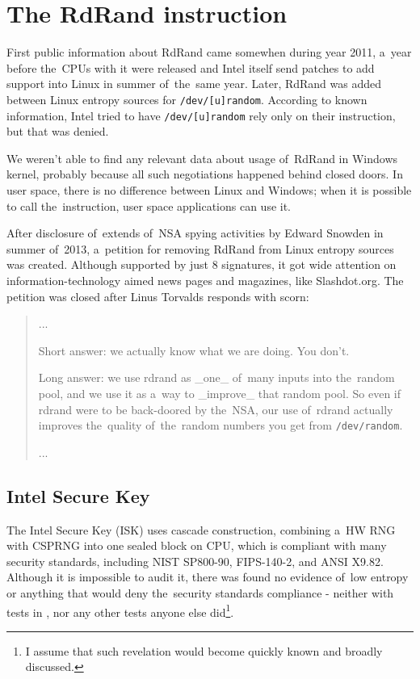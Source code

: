 \chapter{The RdRand instruction}  \label{chap:rdrand-instruction}
First public information about RdRand came somewhen during year 2011\cite{IntelRdRandFindAbout}, a~year before the~CPUs with it were released and Intel itself send patches to add support into Linux in summer of~the~same year\cite{KernelRdRand}. Later, RdRand was added between Linux entropy sources for {\tt /dev/[u]random}.%
According to known information\cite{TheodoreTsoNSA}, Intel tried to have {\tt /dev/[u]random} rely only on their instruction, but that was denied. 

We weren't able to find any relevant data about usage of~RdRand in Windows kernel, probably because all such negotiations happened behind closed doors. In user space, there is no difference between Linux and Windows; when it is possible to call the~instruction, user space applications can use it. 

After disclosure of~extends of~NSA spying activities by Edward Snowden in summer of~2013\cite{GuardianNSA}\cite{DailymailNSA}, a~petition for removing RdRand from Linux entropy sources was created\cite{PetitionRdRand}. Although supported by just 8 signatures, it got wide attention on information-technology aimed news pages and magazines, like Slashdot.org\cite{PetitionRdRandSlashdot}. The petition was closed after Linus Torvalds responds with scorn:

\begin{quote} ...

Short answer: we actually know what we are doing. You don't.

Long answer: we use rdrand as \_one\_ of~many inputs into the~random pool, and we use it as a~way to \_improve\_ that random pool. So even if rdrand were to be back-doored by the~NSA, our use of~rdrand actually improves the~quality of~the~random numbers you get from {\tt /dev/random}.

...
\end{quote}


\section{Intel Secure Key}\label{sec:intel-secure-key}
The Intel Secure Key (ISK) uses cascade construction, combining a~HW RNG with CSPRNG into one sealed block on CPU, which is compliant with many security standards, including NIST SP800-90, FIPS-140-2, and ANSI X9.82\cite{IntelDRNGGuide}. Although it is impossible to audit it, there was found no evidence of~low entropy or anything that would deny the~security standards compliance - neither with tests in , nor any other tests anyone else did\footnote{I assume that such revelation would become quickly known and broadly discussed.}.

